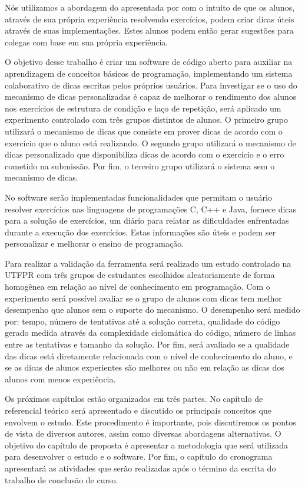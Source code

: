 Nós utilizamos a abordagem do  apresentada por  com o intuito de que os alunos, através de sua própria experiência resolvendo exercícios, podem criar dicas úteis através de suas implementações. Estes alunos podem então gerar sugestões para colegas com base em sua própria experiência.

O objetivo desse trabalho é criar um software de código aberto para auxiliar na aprendizagem de conceitos básicos de programação, implementando um sistema colaborativo de dicas escritas pelos próprios usuários. Para investigar se o uso do mecanismo de dicas personalizadas é capaz de melhorar o rendimento dos alunos nos exercícios de estrutura de condição e laço de repetição, será aplicado um experimento controlado com três grupos distintos de alunos. O primeiro grupo utilizará o mecanismo de dicas que consiste em prover dicas de acordo com o exercício que o aluno está realizando. O segundo grupo utilizará o mecanismo de dicas personalizado que disponibiliza dicas de acordo com o exercício e o erro cometido na submissão. Por fim, o terceiro grupo utilizará o sistema sem o mecanismo de dicas.

No software serão implementadas funcionalidades que permitam o usuário resolver exercícios nas linguagens de programações C, C++ e Java, fornece dicas para a solução de exercícios, um diário para relatar as dificuldades enfrentadas durante a execução dos exercícios. Estas informações são úteis e podem ser personalizar e melhorar o ensino de programação.

Para realizar a validação da ferramenta será realizado um estudo controlado na UTFPR com três grupos de estudantes escolhidos aleatoriamente de forma homogênea em relação ao nível de conhecimento em programação. Com o experimento será possível avaliar se o grupo de alunos com dicas tem melhor desempenho que alunos sem o suporte do mecanismo. O desempenho será medido por: tempo, número de tentativas até a solução correta, qualidade do código gerado medida através da complexidade ciclomática do código, número de linhas entre as tentativas e tamanho da solução. Por fim, será avaliado se a qualidade das dicas está diretamente relacionada com o nível de conhecimento do aluno, e se as dicas de alunos experientes são melhores ou não em relação as dicas dos alunos com menos experiência.

Os próximos capítulos estão organizados em três partes. No capítulo de referencial teórico será apresentado e discutido os principais conceitos que envolvem o estudo. Este procedimento é importante, pois discutiremos os pontos de vista de diversos autores, assim como diversas abordagens alternativas. O objetivo do capítulo de proposta é apresentar a metodologia que será utilizada para desenvolver o estudo e o software. Por fim, o capítulo do cronograma apresentará as atividades que serão realizadas após o término da escrita do trabalho de conclusão de curso.